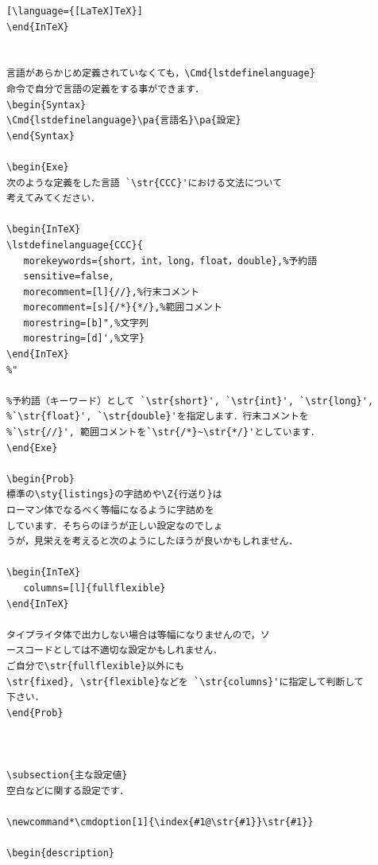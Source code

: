 \begin{InTeX}
\begin{lstlisting}[\language={[LaTeX]TeX}]
\end{InTeX}


言語があらかじめ定義されていなくても，\Cmd{lstdefinelanguage}
命令で自分で言語の定義をする事ができます．
\begin{Syntax}
\Cmd{lstdefinelanguage}\pa{言語名}\pa{設定}
\end{Syntax}

\begin{Exe}
次のような定義をした言語 `\str{CCC}'における文法について
考えてみてください．

\begin{InTeX}
\lstdefinelanguage{CCC}{
   morekeywords={short，int，long，float，double},%予約語
   sensitive=false,
   morecomment=[l]{//},%行末コメント
   morecomment=[s]{/*}{*/},%範囲コメント
   morestring=[b]",%文字列
   morestring=[d]',%文字}
\end{InTeX}
%"

%予約語（キーワード）として `\str{short}', `\str{int}', `\str{long}',
%`\str{float}', `\str{double}'を指定します．行末コメントを
%`\str{//}', 範囲コメントを`\str{/*}~\str{*/}'としています．
\end{Exe} 

\begin{Prob}
標準の\sty{listings}の字詰めや\Z{行送り}は
ローマン体でなるべく等幅になるように字詰めを
しています．そちらのほうが正しい設定なのでしょ
うが，見栄えを考えると次のようにしたほうが良いかもしれません．

\begin{InTeX}
   columns=[l]{fullflexible}
\end{InTeX}

タイプライタ体で出力しない場合は等幅になりませんので，ソ
ースコードとしては不適切な設定かもしれません．
ご自分で\str{fullflexible}以外にも
\str{fixed}, \str{flexible}などを `\str{columns}'に指定して判断して
下さい．
\end{Prob}



\subsection{主な設定値}
空白などに関する設定です．

\newcommand*\cmdoption[1]{\index{#1@\str{#1}}\str{#1}}

\begin{description}


\end{lstlisting}
\end{InTeX}
